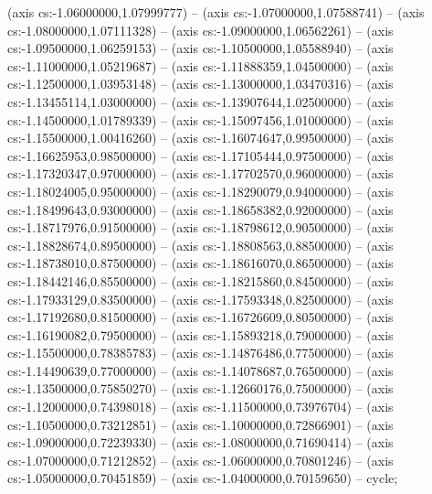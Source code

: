 (axis cs:-1.06000000,1.07999777) -- (axis cs:-1.07000000,1.07588741) -- (axis cs:-1.08000000,1.07111328) -- (axis cs:-1.09000000,1.06562261) -- (axis cs:-1.09500000,1.06259153) -- (axis cs:-1.10500000,1.05588940) -- (axis cs:-1.11000000,1.05219687) -- (axis cs:-1.11888359,1.04500000) -- (axis cs:-1.12500000,1.03953148) -- (axis cs:-1.13000000,1.03470316) -- (axis cs:-1.13455114,1.03000000) -- (axis cs:-1.13907644,1.02500000) -- (axis cs:-1.14500000,1.01789339) -- (axis cs:-1.15097456,1.01000000) -- (axis cs:-1.15500000,1.00416260) -- (axis cs:-1.16074647,0.99500000) -- (axis cs:-1.16625953,0.98500000) -- (axis cs:-1.17105444,0.97500000) -- (axis cs:-1.17320347,0.97000000) -- (axis cs:-1.17702570,0.96000000) -- (axis cs:-1.18024005,0.95000000) -- (axis cs:-1.18290079,0.94000000) -- (axis cs:-1.18499643,0.93000000) -- (axis cs:-1.18658382,0.92000000) -- (axis cs:-1.18717976,0.91500000) -- (axis cs:-1.18798612,0.90500000) -- (axis cs:-1.18828674,0.89500000) -- (axis cs:-1.18808563,0.88500000) -- (axis cs:-1.18738010,0.87500000) -- (axis cs:-1.18616070,0.86500000) -- (axis cs:-1.18442146,0.85500000) -- (axis cs:-1.18215860,0.84500000) -- (axis cs:-1.17933129,0.83500000) -- (axis cs:-1.17593348,0.82500000) -- (axis cs:-1.17192680,0.81500000) -- (axis cs:-1.16726609,0.80500000) -- (axis cs:-1.16190082,0.79500000) -- (axis cs:-1.15893218,0.79000000) -- (axis cs:-1.15500000,0.78385783) -- (axis cs:-1.14876486,0.77500000) -- (axis cs:-1.14490639,0.77000000) -- (axis cs:-1.14078687,0.76500000) -- (axis cs:-1.13500000,0.75850270) -- (axis cs:-1.12660176,0.75000000) -- (axis cs:-1.12000000,0.74398018) -- (axis cs:-1.11500000,0.73976704) -- (axis cs:-1.10500000,0.73212851) -- (axis cs:-1.10000000,0.72866901) -- (axis cs:-1.09000000,0.72239330) -- (axis cs:-1.08000000,0.71690414) -- (axis cs:-1.07000000,0.71212852) -- (axis cs:-1.06000000,0.70801246) -- (axis cs:-1.05000000,0.70451859) -- (axis cs:-1.04000000,0.70159650) -- cycle;
